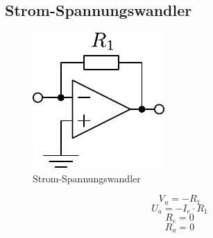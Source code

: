 



\subsection{Strom-Spannungswandler}
\begin{figure}[h!]
	\centering
	\includegraphics[scale=\schscale]{../fig/op_iu.pdf}
	\caption{Strom-Spannungswandler}
	\label{sch:op-iu}
\end{figure}
\[ V_u = - R_1 \]
\[ U_a = - I_e \cdot R_1 \]
\[ R_e = 0 \]
\[ R_a = 0 \]